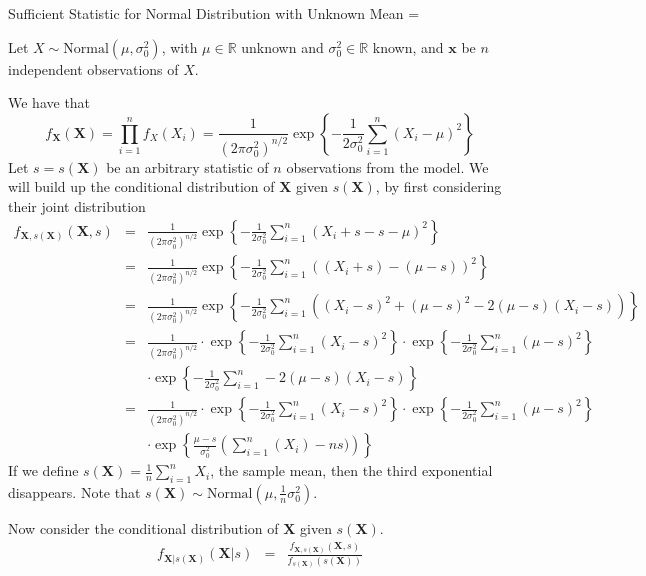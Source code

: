 \documentclass[11pt,a4paper,margin=0]{article}
\theoremstyle{break}
\begin{document}
  \begin{example}{Sufficient Statistic for Normal Distribution with Unknown Mean}
    \everymath={\displaystyle}
    \par\par Let $X\sim\text{Normal}(\mu,\sigma^2_0)$, with $\mu\in\mathbb{R}$ unknown and $\sigma_0^2\in\mathbb{R}$ known, and $\mathbf{x}$ be $n$ independent observations of $X$.
    \par We have that
    \[
      f_{\mathbf{X}}(\mathbf{X})=\prod_{i=1}^nf_X(X_i)=\frac1{(2\pi\sigma_0^2)^{n/2}}\exp\left\{-\frac1{2\sigma_0^2}\sum_{i=1}^n(X_i-\mu)^2\right\}
    \]
    Let $s=s(\mathbf{X})$ be an arbitrary statistic of $n$ observations from the model. We will build up the conditional distribution of $\mathbf{X}$ given $s(\mathbf{X})$, by first considering their joint distribution
    \[\begin{array}{rcl}
      f_{\mathbf{X},s(\mathbf{X})}(\mathbf{X},s)&=&\frac1{(2\pi\sigma_0^2)^{n/2}}\exp\left\{-\frac1{2\sigma_0^2}\sum_{i=1}^n(X_i+s-s-\mu)^2\right\}\\
      &=&\frac1{(2\pi\sigma_0^2)^{n/2}}\exp\left\{-\frac1{2\sigma_0^2}\sum_{i=1}^n((X_i+s)-(\mu-s))^2\right\}\\
      &=&\frac1{(2\pi\sigma_0^2)^{n/2}}\exp\left\{-\frac1{2\sigma_0^2}\sum_{i=1}^n\left((X_i-s)^2+(\mu-s)^2-2(\mu-s)(X_i-s)\right)\right\}\\
      &=&\frac1{(2\pi\sigma_0^2)^{n/2}}\cdot\exp\left\{-\frac1{2\sigma_0^2}\sum_{i=1}^n(X_i-s)^2\right\}\cdot\exp\left\{-\frac1{2\sigma_0^2}\sum_{i=1}^n(\mu-s)^2\right\}\\
      &&\cdot\exp\left\{-\frac1{2\sigma_0^2}\sum_{i=1}^n-2(\mu-s)(X_i-s)\right\}\\
      &=&\frac1{(2\pi\sigma_0^2)^{n/2}}\cdot\exp\left\{-\frac1{2\sigma_0^2}\sum_{i=1}^n(X_i-s)^2\right\}\cdot\exp\left\{-\frac1{2\sigma_0^2}\sum_{i=1}^n(\mu-s)^2\right\}\\
      &&\cdot\exp\left\{\frac{\mu-s}{\sigma_0^2}\left(\sum_{i=1}^n(X_i)-ns)\right)\right\}
    \end{array}\]
    If we define $s(\mathbf{X})=\frac1n\sum_{i=1}^nX_i$, the sample mean, then the third exponential disappears. Note that $s(\mathbf{X})\sim\text{Normal}\left(\mu,\frac1n\sigma_0^2\right)$.
    \par Now consider the conditional distribution of $\mathbf{X}$ given $s(\mathbf{X})$.
    \[\begin{array}{rcl}
      f_{\mathbf{X}|s(\mathbf{X})}(\mathbf{X}|s)&=&\frac{f_{\mathbf{X},s(\mathbf{X})}(\mathbf{X},s)}{f_{s(\mathbf{X})}(s(\mathbf{X}))}\\

\end{array}\]
\end{example}
\end{document}

